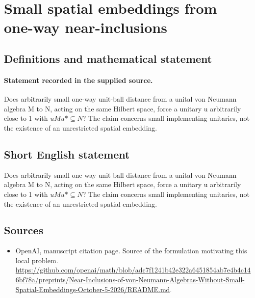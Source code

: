 \documentclass[11pt]{article}
\begin{document}
\section*{Small spatial embeddings from one-way near-inclusions}\label{30007308}
\subsection{Definitions and mathematical statement}
\paragraph{Statement recorded in the supplied source.}
Does arbitrarily small one-way unit-ball distance from a unital von Neumann algebra M to N, acting on the same Hilbert space, force a unitary u arbitrarily close to 1 with $uMu*\subseteq N$? The claim concerns small implementing unitaries, not the existence of an unrestricted spatial embedding.
\subsection{Short English statement}
Does arbitrarily small one-way unit-ball distance from a unital von Neumann algebra M to N, acting on the same Hilbert space, force a unitary u arbitrarily close to 1 with $uMu*\subseteq N$? The claim concerns small implementing unitaries, not the existence of an unrestricted spatial embedding.
\subsection{Sources}
\begin{itemize}
\item[S1] OpenAI, manuscript citation page. Source of the formulation motivating this local problem.
\url{https://github.com/openai/math/blob/adc7f1241b42e322a6451854ab7e4b4c146bf78a/preprints/Near-Inclusions-of-von-Neumann-Algebras-Without-Small-Spatial-Embeddings-October-5-2026/README.md}.
\end{itemize}
\end{document}
